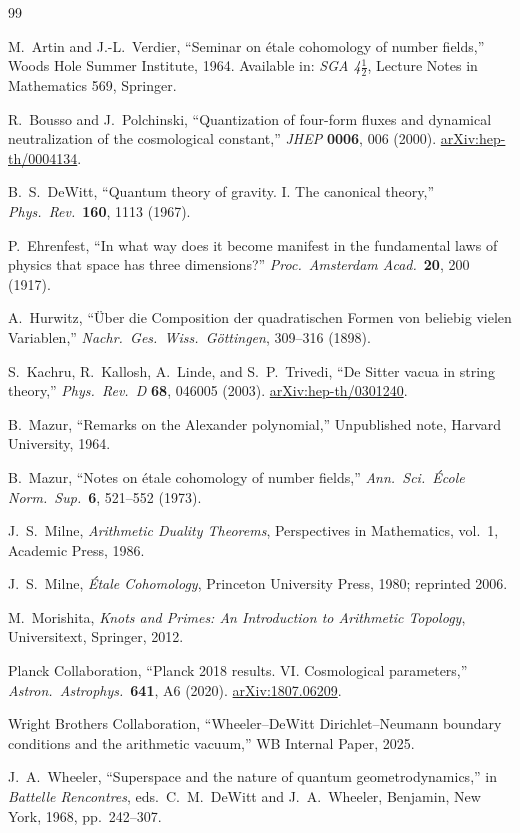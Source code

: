 \documentclass[12pt,a4paper]{article}
\theoremstyle{definition}
\begin{document}
\begin{thebibliography}{99}

M.~Artin and J.-L.~Verdier,
``Seminar on \'etale cohomology of number fields,''
Woods Hole Summer Institute, 1964.
Available in: \textit{SGA 4$\frac{1}{2}$}, Lecture Notes in Mathematics 569, Springer.

R.~Bousso and J.~Polchinski,
``Quantization of four-form fluxes and dynamical neutralization of the cosmological
constant,''
\textit{JHEP} \textbf{0006}, 006 (2000).
\href{https://arxiv.org/abs/hep-th/0004134}{arXiv:hep-th/0004134}.

B.~S.~DeWitt,
``Quantum theory of gravity. I. The canonical theory,''
\textit{Phys.\ Rev.}\ \textbf{160}, 1113 (1967).

P.~Ehrenfest,
``In what way does it become manifest in the fundamental laws of physics that space
has three dimensions?''
\textit{Proc.\ Amsterdam Acad.}\ \textbf{20}, 200 (1917).

A.~Hurwitz,
``\"Uber die Composition der quadratischen Formen von beliebig vielen Variablen,''
\textit{Nachr.\ Ges.\ Wiss.\ G\"ottingen}, 309--316 (1898).

S.~Kachru, R.~Kallosh, A.~Linde, and S.~P.~Trivedi,
``De Sitter vacua in string theory,''
\textit{Phys.\ Rev.\ D} \textbf{68}, 046005 (2003).
\href{https://arxiv.org/abs/hep-th/0301240}{arXiv:hep-th/0301240}.

B.~Mazur,
``Remarks on the Alexander polynomial,''
Unpublished note, Harvard University, 1964.

B.~Mazur,
``Notes on \'etale cohomology of number fields,''
\textit{Ann.\ Sci.\ \'Ecole Norm.\ Sup.}\ \textbf{6}, 521--552 (1973).

J.~S.~Milne,
\textit{Arithmetic Duality Theorems},
Perspectives in Mathematics, vol.~1, Academic Press, 1986.

J.~S.~Milne,
\textit{\'Etale Cohomology},
Princeton University Press, 1980; reprinted 2006.

M.~Morishita,
\textit{Knots and Primes: An Introduction to Arithmetic Topology},
Universitext, Springer, 2012.

Planck Collaboration,
``Planck 2018 results. VI. Cosmological parameters,''
\textit{Astron.\ Astrophys.}\ \textbf{641}, A6 (2020).
\href{https://arxiv.org/abs/1807.06209}{arXiv:1807.06209}.

Wright Brothers Collaboration,
``Wheeler--DeWitt Dirichlet--Neumann boundary conditions and the arithmetic vacuum,''
WB Internal Paper, 2025.

J.~A.~Wheeler,
``Superspace and the nature of quantum geometrodynamics,''
in \textit{Battelle Rencontres}, eds.\ C.~M.~DeWitt and J.~A.~Wheeler,
Benjamin, New York, 1968, pp.~242--307.

\end{thebibliography}
\end{document}
